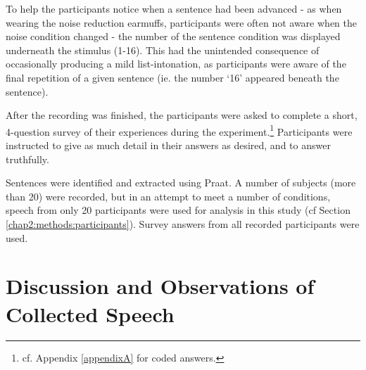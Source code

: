 To help the participants notice when a sentence had been advanced - as when wearing the noise reduction earmuffs, participants were often not aware when the noise condition changed - the number of the sentence condition was displayed underneath the stimulus (1-16).  This had the unintended consequence of occasionally producing a mild list-intonation, as participants were aware of the final repetition of a given sentence (ie. the number `16' appeared beneath the sentence). 

After the recording was finished, the participants were asked to complete a short, 4-question survey of their experiences during the experiment.\footnote{cf. Appendix \ref{appendixA} for coded answers.}  
Participants were instructed to give as much detail in their answers as desired, and to answer truthfully.  

Sentences were identified and extracted using Praat.  A number of subjects (more than 20) were recorded, but in an attempt to meet a number of conditions, speech from only 20 participants were used for analysis in this study (cf Section \ref{chap2:methods:participants}).  Survey answers from all recorded participants were used.




\section{Discussion and Observations of Collected Speech}\label{chap2:observations}

